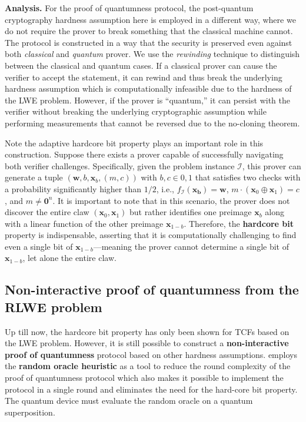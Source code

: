\noindent\textbf{Analysis.} For the proof of quantumness protocol, the post-quantum cryptography hardness assumption here is employed in a different way, where we do not require the prover to break something that the classical machine cannot. The protocol is constructed in a way that the security is preserved even against both \textit{classical} and \textit{quantum} prover. We use the \textit{rewinding} technique to distinguish between the classical and quantum cases. If a classical prover can cause the verifier to accept the statement, it can rewind and thus break the underlying hardness assumption which is computationally infeasible due to the hardness of the LWE problem. However, if the prover is ``quantum,'' it can persist with the verifier without breaking the underlying cryptographic assumption while performing measurements that cannot be reversed due to the no-cloning theorem.

Note the adaptive hardcore bit property plays an important role in this construction. Suppose there exists a prover capable of successfully navigating both verifier challenges. Specifically, given the problem instance $\mathcal{I}$, this prover can generate a tuple $(\mathbf{w}, b, \mathbf{x}_b, (m, c))$ with $b,c \in {0,1}$ that satisfies two checks with a probability significantly higher than $1/2$, i.e., $f_{\mathcal{I}}(\mathbf{x_b}) = \mathbf{w}$, $m \cdot (\mathbf{x}_0 \oplus \mathbf{x}_1) = c$, and $m \neq \mathbf{0}^n$.
It is important to note that in this scenario, the prover does not discover the entire claw $(\mathbf{x}_0, \mathbf{x}_1)$ but rather identifies one preimage $\mathbf{x}_b$ along with a linear function of the other preimage $\mathbf{x}_{1-b}$. Therefore, the \textbf{hardcore bit} property is indispensable, asserting that it is computationally challenging to find even a single bit of $\mathbf{x}_{1-b}$—meaning the prover cannot determine a single bit of $\mathbf{x}_{1-b}$, let alone the entire claw. 


\subsection{Non-interactive proof of quantumness from the RLWE problem}

Up till now, the hardcore bit property has only been shown for TCFs based on the LWE problem. However, it is still possible to construct a \textbf{non-interactive proof of quantumness} protocol based on other hardness assumptions. \cite{BrakerskiProofofQuantumness} employs the \textbf{random oracle heuristic} as a tool to reduce the round complexity of the proof of quantumness protocol which also makes it possible to implement the protocol in a single round and eliminates the need for the hard-core bit property. The quantum device must evaluate the random oracle on a quantum superposition.

